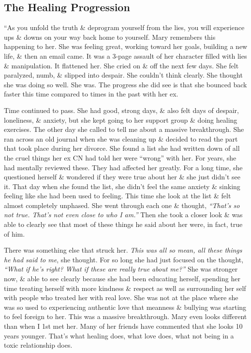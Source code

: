 \documentclass{article}
\numberwithin{equation}{section}
\begin{document}
\subsection{The Healing Progression}
``As you unfold the truth \& deprogram yourself from the lies, you will experience ups \& downs on your way back home to yourself. Mary remembers this happening to her. She was feeling great, working toward her goals, building a new life, \& then an email came. It was a 3-page assault of her character filled with lies \& manipulation. It flattened her. She cried on \& off the next few days. She felt paralyzed, numb, \& slipped into despair. She couldn't think clearly. She thought she was doing so well. She was. The progress she did see is that she bounced back faster this time compared to times in the past with her ex.

Time continued to pass. She had good, strong days, \& also felt days of despair, loneliness, \& anxiety, but she kept going to her support group \& doing healing exercises. The other day she called to tell me about a massive breakthrough. She ran across an old journal when she was cleaning up \& decided to read the part that took place during her divorce. She found a list she had written down of all the cruel things her ex CN had told her were ``wrong'' with her. For years, she had mentally reviewed these. They had affected her greatly. For a long time, she questioned herself \& wondered if they were true about her \& she just didn't see it. That day when she found the list, she didn't feel the same anxiety \& sinking feeling like she had been used to feeling. This time she look at the list \& felt almost completely unphased. She went through each one \& thought, \textit{``That's so not true. That's not even close to who I am.''} Then she took a closer look \& was able to clearly see that most of these things he said about her were, in fact, true of him.

There was something else that struck her. \textit{This was all so mean, all these things he had said to me}, she thought. For so long she had just focused on the thought, \textit{``What if he's right? What if these are really true about me?''} She was stronger now, \& able to see clearly because she had been educating herself, spending her time treating herself with more kindness \& respect as well as surrounding her self with people who treated her with real love. She was not at the place where she was so used to experiencing authentic love that meanness \& bullying was starting to feel foreign to her. This was a massive breakthrough. Mary even looks different than when I 1st met her. Many of her friends have commented that she looks 10 years younger. That's what healing does, what love does, what not being in a toxic relationship does.
\end{document}
